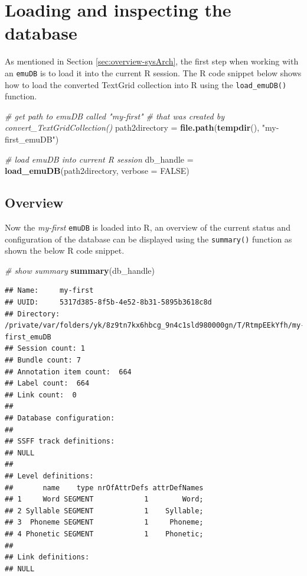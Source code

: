 \documentclass[]{book}
\newenvironment{Shaded}{\begin{snugshade}}{\end{snugshade}}
\newcommand{\CommentTok}[1]{\textcolor[rgb]{0.56,0.35,0.01}{\textit{#1}}}
\newcommand{\DataTypeTok}[1]{\textcolor[rgb]{0.13,0.29,0.53}{#1}}
\newcommand{\KeywordTok}[1]{\textcolor[rgb]{0.13,0.29,0.53}{\textbf{#1}}}
\newcommand{\NormalTok}[1]{#1}
\newcommand{\OtherTok}[1]{\textcolor[rgb]{0.56,0.35,0.01}{#1}}
\newcommand{\StringTok}[1]{\textcolor[rgb]{0.31,0.60,0.02}{#1}}
\theoremstyle{definition}
\theoremstyle{definition}
\theoremstyle{definition}
\theoremstyle{remark}
\begin{document}
\hypertarget{loading-and-inspecting-the-database}{%
\section{Loading and inspecting the
database}\label{loading-and-inspecting-the-database}}

As mentioned in Section \ref{sec:overview-sysArch}, the first step when
working with an \texttt{emuDB} is to load it into the current R session.
The R code snippet below shows how to load the converted TextGrid
collection into R using the \texttt{load\_emuDB()} function.

\begin{Shaded}
\begin{Highlighting}[]
\CommentTok{# get path to emuDB called "my-first"}
\CommentTok{# that was created by convert_TextGridCollection()}
\NormalTok{path2directory =}\StringTok{ }\KeywordTok{file.path}\NormalTok{(}\KeywordTok{tempdir}\NormalTok{(), }\StringTok{"my-first_emuDB"}\NormalTok{)}

\CommentTok{# load emuDB into current R session}
\NormalTok{db_handle =}\StringTok{ }\KeywordTok{load_emuDB}\NormalTok{(path2directory, }\DataTypeTok{verbose =} \OtherTok{FALSE}\NormalTok{)}
\end{Highlighting}
\end{Shaded}

\hypertarget{overview}{%
\subsection{Overview}\label{overview}}

Now the \emph{my-first} \texttt{emuDB} is loaded into R, an overview of
the current status and configuration of the database can be displayed
using the \texttt{summary()} function as shown the below R code snippet.

\begin{Shaded}
\begin{Highlighting}[]
\CommentTok{# show summary}
\KeywordTok{summary}\NormalTok{(db_handle)}
\end{Highlighting}
\end{Shaded}

\begin{verbatim}
## Name:     my-first 
## UUID:     5317d385-8f5b-4e52-8b31-5895b3618c8d 
## Directory:    /private/var/folders/yk/8z9tn7kx6hbcg_9n4c1sld980000gn/T/RtmpEEkYfh/my-first_emuDB 
## Session count: 1 
## Bundle count: 7 
## Annotation item count:  664 
## Label count:  664 
## Link count:  0 
## 
## Database configuration:
## 
## SSFF track definitions:
## NULL
## 
## Level definitions:
##       name    type nrOfAttrDefs attrDefNames
## 1     Word SEGMENT            1        Word;
## 2 Syllable SEGMENT            1    Syllable;
## 3  Phoneme SEGMENT            1     Phoneme;
## 4 Phonetic SEGMENT            1    Phonetic;
## 
## Link definitions:
## NULL
\end{verbatim}
\end{document}
